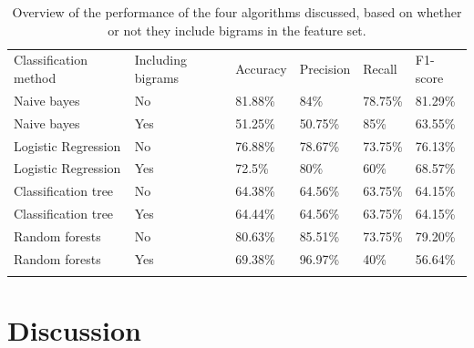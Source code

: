 \documentclass[a4paper,11pt]{article}
\begin{document}
\begin{table}[H]
\centering
\caption{Overview of the performance of the four algorithms discussed, based on whether or not they include bigrams in the feature set.}
\label{table:performanceOverview}
\begin{tabular}{|l|l|l|l|l|l|}
\Xhline{2\arrayrulewidth}
Classification method & Including bigrams & Accuracy & Precision & Recall  & F1-score \\
\Xhline{2\arrayrulewidth}
Naive bayes           & No                & 81.88\%  & 84\%      & 78.75\% & 81.29\%  \\
Naive bayes           & Yes               & 51.25\%  & 50.75\%   & 85\%    & 63.55\%  \\
\Xhline{2\arrayrulewidth}
Logistic Regression   & No                & 76.88\%  & 78.67\%   & 73.75\% & 76.13\%  \\
Logistic Regression   & Yes               & 72.5\%   & 80\%      & 60\%    & 68.57\%  \\
\Xhline{2\arrayrulewidth}
Classification tree   & No                & 64.38\%  & 64.56\%   & 63.75\% & 64.15\%  \\
Classification tree   & Yes               & 64.44\%  & 64.56\%   & 63.75\% & 64.15\%  \\
\Xhline{2\arrayrulewidth}
Random forests         & No                & 80.63\%  & 85.51\%   & 73.75\% & 79.20\%  \\
Random forests         & Yes               & 69.38\%  & 96.97\%   & 40\%    & 56.64\%  \\
\Xhline{2\arrayrulewidth}
\end{tabular}
\end{table}

\section{Discussion}
\end{document}
